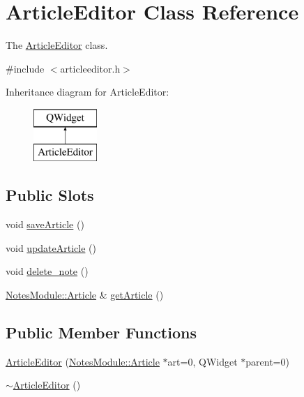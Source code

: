 \hypertarget{class_article_editor}{\section{Article\-Editor Class Reference}
\label{class_article_editor}
}


The \hyperlink{class_article_editor}{Article\-Editor} class.  




{\ttfamily \#include $<$articleeditor.\-h$>$}

Inheritance diagram for Article\-Editor\-:\begin{figure}[H]
\begin{center}
\leavevmode
\includegraphics[height=2.000000cm]{class_article_editor}
\end{center}
\end{figure}
\subsection*{Public Slots}
\begin{DoxyCompactItemize}
\item 
void \hyperlink{class_article_editor_a94c24d01df48de1b6c5f39e01f5fde73}{save\-Article} ()
\item 
void \hyperlink{class_article_editor_a9e33382600eae2dfbffcfe82b68ab6b8}{update\-Article} ()
\item 
void \hyperlink{class_article_editor_a3c699eafa07aec90b35cb53e9e1d5e39}{delete\-\_\-note} ()
\item 
\hyperlink{class_notes_module_1_1_article}{Notes\-Module\-::\-Article} \& \hyperlink{class_article_editor_a611d4f858eeea56a689fceb065b1e092}{get\-Article} ()
\end{DoxyCompactItemize}
\subsection*{Public Member Functions}
\begin{DoxyCompactItemize}
\item 
\hyperlink{class_article_editor_a5b5b9eb88044caa7e9f2108b97333fb8}{Article\-Editor} (\hyperlink{class_notes_module_1_1_article}{Notes\-Module\-::\-Article} $\ast$art=0, Q\-Widget $\ast$parent=0)
\item 
\hyperlink{class_article_editor_a8f077f15c7b5285bec9a8dd811f71e58}{$\sim$\-Article\-Editor} ()
\end{DoxyCompactItemize}


